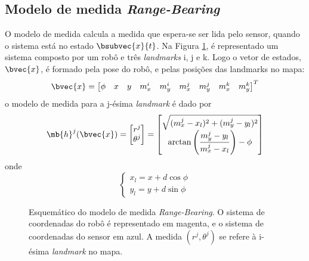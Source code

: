 \subsection{Modelo de medida \textit{Range-Bearing}}
O modelo de medida calcula a medida que espera-se ser lida pelo sensor, quando o sistema está no estado $\bsubvec{x}{t}$. Na Figura \ref{fig:range-bearing-measurement-schematic}, é representado um sistema composto por um robô e três \textit{landmarks} i, j e k. Logo o vetor de estados, $\bvec{x}$, é formado pela pose do robô, e pelas posições das landmarks no mapa:
\begin{equation}
  \bvec{x} = \begin{bmatrix}
    \phi & x & y & m_x^i & m_y^i & m_x^j & m_y^j & m_x^k & m_y^k
  \end{bmatrix}^T
\end{equation}
o modelo de medida para a j-ésima \textit{landmark} é dado por
\renewcommand{\arraystretch}{1.5}
\begin{equation}
  \mb{h}^j(\bvec{x}) = \begin{bmatrix}
    r^j \\ \theta^j
  \end{bmatrix} = \begin{bmatrix}
    \sqrt{(m_x^j - x_l)^2 + (m_y^j - y_l)^2} \\
    \arctan\left(\dfrac{m_y^j - y_l}{m_x^j - x_l}\right) - \phi
  \end{bmatrix}
  \label{eq:range-bearing-measurement-model}
\end{equation}
\renewcommand{\arraystretch}{1}
onde
\begin{equation}
  \begin{cases}
    x_l = x + d \cos \phi\\
    y_l = y + d \sin \phi
  \end{cases}
\end{equation}

\begin{figure}[h]
  \centering
  
  \caption{Esquemático do modelo de medida \textit{Range-Bearing}. O sistema de coordenadas do robô é representado em magenta, e o sistema de coordenadas do sensor em azul. A medida $(r^j, \theta^j)$ se refere à i-ésima \textit{landmark} no mapa.}
  \label{fig:range-bearing-measurement-schematic}
\end{figure}

